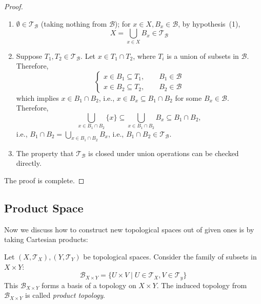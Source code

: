 \begin{proof}
\begin{enumerate}
\item
$\emptyset\in\mathcal{T}_{\mathcal{B}}$ (taking nothing from $\mathcal{B}$); for $x\in X,B_x\in\mathcal{B}$, by hypothesis~(1),
\[
X=\bigcup_{x\in X}B_x\in\mathcal{T}_{\mathcal{B}}
\]
\item
Suppose $T_1,T_2\in\mathcal{T}_{\mathcal{B}}$. Let $x\in T_1\cap T_2 $, 
where $T_i$ is a union of subsets in $\mathcal{B}$. Therefore,
\[
\left\{
\begin{aligned}
x\in B_1\subseteq T_1,\qquad B_1\in\mathcal{B}\\
x\in B_2\subseteq T_2,\qquad B_2\in\mathcal{B}
\end{aligned}
\right.
\]
which implies $x\in B_1\cap B_2$, i.e., $x\in B_x\subseteq B_1\cap B_2$ for some $B_x\in\mathcal{B}$.
Therefore,
\[
\bigcup_{x\in B_1\cap B_2}\{x\}\subseteq
\bigcup_{x\in B_1\cap B_2}B_x\subseteq B_1\cap B_2,
\]
i.e., $B_1\cap B_2=\bigcup_{x\in B_1\cap B_2}B_x$, i.e., $B_1\cap B_2\in\mathcal{T}_{\mathcal{B}}$.
\item
The property that $\mathcal{T}_{\mathcal{B}}$ is closed under union operations can be checked directly.
\end{enumerate}
The proof is complete.
\end{proof}

\subsection{Product Space}
Now we discuss how to construct new topological spaces out of given ones is by taking Cartesian products:
\begin{definition}\label{def:3:4}
Let $(X,\mathcal{T}_X),(Y,\mathcal{T}_Y)$ be topological spaces. Consider the family of subsets in $X\times Y$:
\[
\mathcal{B}_{X\times Y}=\{U\times V\mid U\in\mathcal{T}_X,V\in\mathcal{T}_y\}
\]
This $\mathcal{B}_{X\times Y}$ forms a basis of a topology on $X\times Y$. The induced topology from $\mathcal{B}_{X\times Y}$ is called \emph{product topology}.
\end{definition}

